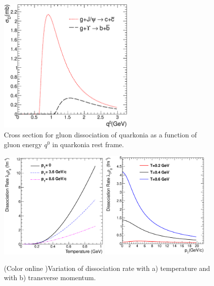 \documentclass[aps,prc,preprint,superscriptaddress,showpacs,showkeys]{revtex4-1}
\begin{document}
\begin{figure}
\includegraphics[width=0.60\textwidth]{SigmaDq0.eps}
\caption{Cross section for gluon dissociation of quarkonia as a function of gluon energy $q^{0}$ in
quarkonia rest frame.}
\label{fig:SigmaDQ0}
\end{figure}

\begin{figure}
\includegraphics[width=0.48\textwidth]{DRateVsT.eps}
\includegraphics[width=0.48\textwidth]{DRateVsPt.eps}
\caption{(Color online )Variation of dissociation rate with a) temperature and with b) transverse momentum.}
\label{fig:DRateVsTempAndPt}
\end{figure}
\end{document}
